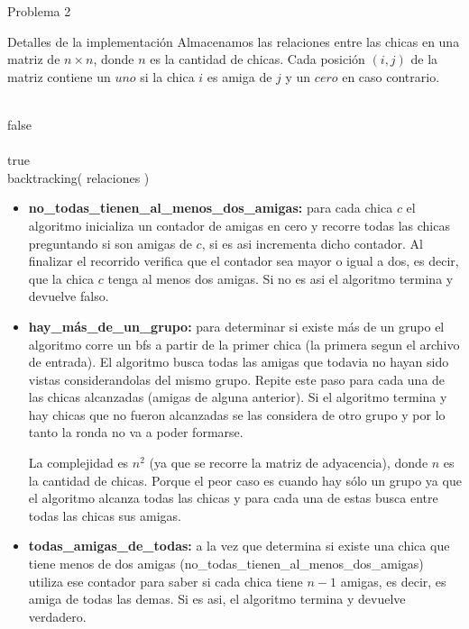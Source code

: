 \begin{section}{Problema 2}
\begin{subsection}{Detalles de la implementación}
		Almacenamos las relaciones entre las chicas en una matriz de $n \times n$, donde $n$ es la cantidad de chicas. Cada posición $(i,j)$ de la matriz contiene un $uno$ si la chica $i$ es amiga de $j$ y un $cero$ en caso contrario.\VSP

		\begin{pseudo}
			\tab{} \\
			\tab\tab \RET false \\
			\tab{} \\
			\tab\tab \RET true \\
			\tab backtracking( relaciones )
		\end{pseudo}

		\begin{itemize}
			\item \textbf{no\_todas\_tienen\_al\_menos\_dos\_amigas:} para cada chica $c$ el algoritmo inicializa un contador de amigas en cero y recorre todas las chicas preguntando si son amigas de $c$, si es asi incrementa dicho contador. Al finalizar el recorrido verifica que el contador sea mayor o igual a dos, es decir, que la chica $c$ tenga al menos dos amigas. Si no es asi el algoritmo termina y devuelve falso.

			\item \textbf{hay\_más\_de\_un\_grupo:} para determinar si existe más de un grupo el algoritmo corre un bfs a partir de la primer chica (la primera segun el archivo de entrada). El algoritmo busca todas las amigas que todavia no hayan sido vistas considerandolas del mismo grupo. Repite este paso para cada una de las chicas alcanzadas (amigas de alguna anterior). Si el algoritmo termina y hay chicas que no fueron alcanzadas se las considera de otro grupo y por lo tanto la ronda no va a poder formarse.

La complejidad es $n^2$ (ya que se recorre la matriz de adyacencia), donde $n$ es la cantidad de chicas. Porque el peor caso es cuando hay sólo un grupo ya que el algoritmo alcanza todas las chicas y para cada una de estas busca entre todas las chicas sus amigas.

		\item \textbf{todas\_amigas\_de\_todas:} a la vez que determina si existe una chica que tiene menos de dos amigas (no\_todas\_tienen\_al\_menos\_dos\_amigas) utiliza ese contador para saber si cada chica tiene $n-1$ amigas, es decir, es amiga de todas las demas. Si es asi, el algoritmo termina y devuelve verdadero.


\end{itemize}
\end{subsection}
\end{section}
